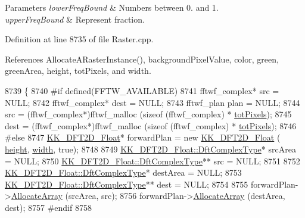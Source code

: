 \begin{DoxyParams}{Parameters}
{\em lower\+Freq\+Bound} & Number\textquotesingle{}s between 0. and 1. \\
\hline
{\em upper\+Freq\+Bound} & Represent fraction. \\
\hline
\end{DoxyParams}


Definition at line 8735 of file Raster.\+cpp.



References Allocate\+A\+Raster\+Instance(), background\+Pixel\+Value, color, green, green\+Area, height, tot\+Pixels, and width.


\begin{DoxyCode}
8739 \{
8740 \textcolor{preprocessor}{  #if  defined(FFTW\_AVAILABLE)}
8741     fftwf\_complex*   src  = NULL;
8742     fftwf\_complex*   dest = NULL;
8743     fftwf\_plan       plan = NULL;
8744     src  = (fftwf\_complex*)fftwf\_malloc (\textcolor{keyword}{sizeof} (fftwf\_complex) * \hyperlink{class_k_k_b_1_1_raster_a9b08c4a0ca0a35435a478599635f1dc0}{totPixels});
8745     dest = (fftwf\_complex*)fftwf\_malloc (\textcolor{keyword}{sizeof} (fftwf\_complex) * \hyperlink{class_k_k_b_1_1_raster_a9b08c4a0ca0a35435a478599635f1dc0}{totPixels});
8746 \textcolor{preprocessor}{  #else}
8747     \hyperlink{class_k_k_b_1_1_k_k___d_f_t2_d}{KK\_DFT2D\_Float}*  forwardPlan = \textcolor{keyword}{new} \hyperlink{namespace_k_k_b_a7de386112eca309c8ef4daddd5b64c8b}{KK\_DFT2D\_Float} (
      \hyperlink{class_k_k_b_1_1_raster_af39ff189de4fbb6de98392e187efafb7}{height}, \hyperlink{class_k_k_b_1_1_raster_ae0bcc103e191c3421d7692dc69ceb554}{width}, \textcolor{keyword}{true});
8748 
8749     \hyperlink{class_k_k_b_1_1_k_k___d_f_t2_d_a3277abaea54d0d88958f030092b9ac38}{KK\_DFT2D\_Float::DftComplexType}*   srcArea = NULL;
8750     \hyperlink{class_k_k_b_1_1_k_k___d_f_t2_d_a3277abaea54d0d88958f030092b9ac38}{KK\_DFT2D\_Float::DftComplexType}**  src     = NULL;
8751 
8752     \hyperlink{class_k_k_b_1_1_k_k___d_f_t2_d_a3277abaea54d0d88958f030092b9ac38}{KK\_DFT2D\_Float::DftComplexType}*   destArea = NULL;
8753     \hyperlink{class_k_k_b_1_1_k_k___d_f_t2_d_a3277abaea54d0d88958f030092b9ac38}{KK\_DFT2D\_Float::DftComplexType}**  dest     = NULL;
8754 
8755     forwardPlan->\hyperlink{class_k_k_b_1_1_k_k___d_f_t2_d_a465735c57e85444dd5f7d72dbb416a51}{AllocateArray} (srcArea,  src);
8756     forwardPlan->\hyperlink{class_k_k_b_1_1_k_k___d_f_t2_d_a465735c57e85444dd5f7d72dbb416a51}{AllocateArray} (destArea, dest);
8757 \textcolor{preprocessor}{  #endif}
8758 

\end{DoxyCode}
